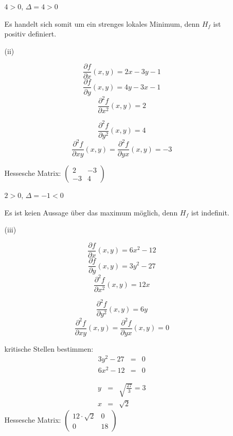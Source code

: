 \documentclass[a4paper,11pt,fleqn]{scrartcl}
\newcommand{\partx}[0]{\frac{\partial f}{\partial x}  (x,y)}
\newcommand{\party}[0]{\frac{\partial f}{\partial y}  (x,y)}
\newcommand{\partxp}[1]{\frac{\partial^#1 f}{\partial x^#1}  (x,y)}
\newcommand{\partyp}[1]{\frac{\partial^#1 f}{\partial y^#1}  (x,y)}
\newcommand{\partxy}[1]{\frac{\partial^#1 f}{\partial xy}  (x,y)}
\newcommand{\partyx}[1]{\frac{\partial^#1 f}{\partial yx}  (x,y)}
\begin{document}
\begin{enumerate}
\begin{enumerate}
                $4 > 0$,
                $\Delta = 4 > 0$

                Es handelt sich somit um ein strenges lokales Minimum, denn $H_f$ ist positiv definiert.
            \item[(ii)]
            \begin{multicols}{2}
                \[\partx = 2x -3y -1\]
                \[\party = 4y -3x -1\]
                \[\partxp{2} = 2\]


                \[\partyp{2} = 4\]
                \[\partxy{2} = \partyx{2} = -3\]
            \end{multicols}
                Hessesche Matrix: $                
                \begin{pmatrix}
                     2 & -3 \\
                    -3 &  4
                \end{pmatrix}
                $

                $2 > 0$,
                $\Delta = -1 < 0$

                Es ist keien Aussage über das maximum möglich, denn $H_f$ ist indefinit.
            \item[(iii)]
            \begin{multicols}{2}
                \[\partx = 6x^2 - 12\]
                \[\party = 3y^2 - 27\]
                \[\partxp{2} = 12x\]


                \[\partyp{2} = 6y\]
                \[\partxy{2} = \partyx{2} = 0\]
            \end{multicols}
                kritische Stellen bestimmen:
                \begin{eqnarray*}
                    3y^2 - 27 &=& 0 \\
                    6x^2 - 12 &=& 0 
                \end{eqnarray*}

                \begin{eqnarray*}
                    y &=& \sqrt{\frac{27}{3}} = 3\\
                    x &=& \sqrt{2} 
                \end{eqnarray*}
                Hessesche Matrix: $               
                \begin{pmatrix}
                     12 \cdot \sqrt{2} & 0 \\
                    0 &  18
                \end{pmatrix}
                $


\end{enumerate}
\end{enumerate}
\end{document}

